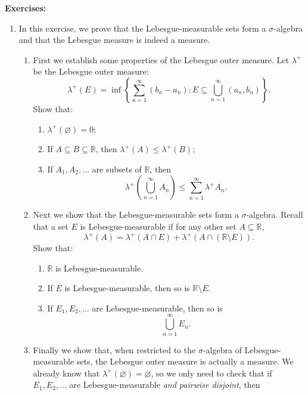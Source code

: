 \documentclass{article}
\let\take\setminus
\begin{document}
\clearpage













\clearpage



\textbf{Exercises:}\bigskip





\begin{enumerate}
	\item In this exercise, we prove that the Lebesgue-measurable sets form a $\sigma$-algebra and that the Lebesgue measure is indeed a measure.
		\begin{enumerate}
			\item First we establish some properties of the Lebesgue outer measure. Let $\lambda^+$ be the Lebesgue outer measure:
				\[\lambda^+(E)=\inf\left\{\sum_{n=1}^\infty (b_n-a_n):E\subseteq \bigcup_{n=1}^\infty (a_n,b_n)\right\}.\]
				Show that:
				\begin{enumerate}
					\item $\lambda^+(\varnothing)=0$;
					\item If $A\subseteq B\subseteq \mathbb{R}$, then $\lambda^+(A)\leq\lambda^+(B)$;
					\item If $A_1,A_2,\hdots$ are subsets of $\mathbb{R}$, then
						\[\lambda^+\left(\bigcup_{n=1}^\infty A_n\right) \leq \sum_{n=1}^\infty \lambda^+ A_n.\]
				\end{enumerate}
			\item Next we show that the Lebesgue-measurable sets form a $\sigma$-algebra. Recall that a set $E$ is Lebesgue-measurable if for any other set $A\subseteq \mathbb{R}$,
				\[\lambda^+(A)=\lambda^+\left(A\cap E\right) + \lambda^+\left(A\cap (\mathbb{R}\take E)\right).\]
				Show that:
				\begin{enumerate}
					\item $\mathbb{R}$ is Lebesgue-measurable.
					\item If $E$ is Lebesgue-measurable, then so is $\mathbb{R}\take E$.
					\item If $E_1,E_2,\hdots$ are Lebesgue-measurable, then so is
						\[\bigcup_{n=1}^\infty E_n.\]
				\end{enumerate}
			\item Finally we show that, when restricted to the $\sigma$-algebra of Lebesgue-measurable sets, the Lebesgue outer measure is actually a measure. We already know that $\lambda^+(\varnothing)=\varnothing$, so we only need to check that if $E_1,E_2,\hdots$ are Lebesgue-measurable \textit{and pairwise disjoint}, then

\end{enumerate}
\end{enumerate}
\end{document}
